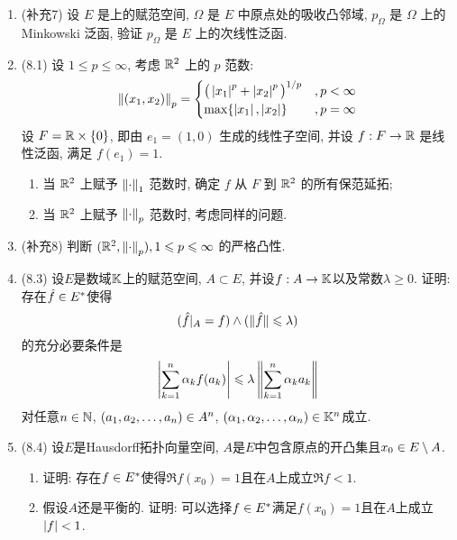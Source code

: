     \begin{enumerate}[label=\textbf{\arabic*.}, ref=\arabic*]
        \item (补充7) 设 $ E $ 是\R 上的赋范空间, $ \varOmega $ 是 $ E $ 中原点处的吸收凸邻域, $ p_{\varOmega} $ 是 $ \varOmega $ 上的 Minkowski 泛函, 验证 $ p_{\varOmega} $ 是 $ E $ 上的次线性泛函.
        \item (8.1) 设 $ 1\leqslant p\leqslant\infty $, 考虑 $ \mathbb{R}^{2} $ 上的 $ p $ 范数:
            \[
                \left\| (x_{1}, x_{2}) \right\|_{p}=
                \begin{cases}
                    \big( \left| x_{1} \right| ^{p}+\left| x_{2} \right| ^{p} \big)^{1/p} & ,p<\infty\\
                    \max\{\left| x_{1} \right| , \left| x_{2} \right| \} & ,p = \infty
                \end{cases}
            \]
            设 $ F=\mathbb{R}\times\{ 0 \} $, 即由 $ e_{1}=(1, 0) $ 生成的线性子空间, 并设 $ f:F\to\mathbb{R} $ 是线性泛函, 满足 $ f(e_{1})=1 $.
            \begin{enumerate}[(1)]
                \item 当 $ \mathbb{R}^{2} $ 上赋予 $ \left\| \cdot \right\|_{1} $ 范数时, 确定 $ f $ 从 $ F $ 到 $ \mathbb{R}^{2} $ 的所有保范延拓;
                \item 当 $ \mathbb{R}^{2} $ 上赋予 $ \left\| \cdot \right\|_{p} $ 范数时, 考虑同样的问题.
            \end{enumerate}
        \item (补充8) 判断 $ (\mathbb{R}^{2}, \left\| \cdot \right\|_{p}), 1\leqslant p\leqslant\infty $ 的严格凸性.
        \item (8.3) 设$ E $是数域$ \mathbb{K} $上的赋范空间, $ A\subset E $, 并设$ f : A\to\mathbb{K} $以及常数$ \lambda\geqslant 0 $. 证明: 存在$ \hat{f}\in E^{*} $使得
            \[
            (\hat{f}\rvert_A=f)\land (\lVert \hat{f}\rVert\leqslant\lambda)
            \]
            的充分必要条件是
            \[
            \left| \sum_{k=1}^n\alpha_kf(a_k) \right| \leqslant\lambda\left\| \sum_{k=1}^n\alpha_ka_k \right\|
            \]
            对任意$ n\in\mathbb{N} $, $ (a_{1}, a_{2}, \dots, a_{n})\in A^n $, $ (\alpha_{1}, \alpha_{2}, \dots, \alpha_{n})\in\mathbb{K}^n $成立.
        \item (8.4) 设$ E $是Hausdorff拓扑向量空间, $ A $是$ E $中包含原点的开凸集且$ x_0\in E\setminus A $.
            \begin{enumerate}[(1)]
            \item 证明: 存在$ f\in E^{*} $使得$ \Re f(x_0)=1 $且在$ A $上成立$ \Re f<1 $.
            \item 假设$ A $还是平衡的. 证明: 可以选择$ f\in E^{*} $满足$ f(x_0)=1 $且在$ A $上成立$ \left| f \right| <1 $.

\end{enumerate}
\end{enumerate}
